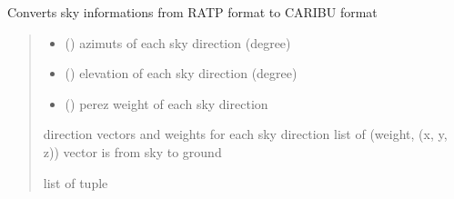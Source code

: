 \documentclass[letterpaper,10pt,english]{sphinxmanual}
\begin{document}
\begin{fulllineitems}
\label{\detokenize{reference:sky.ratpformat_to_caribuformat}}
\pysigstartsignatures
{}
\pysigstopsignatures
\sphinxAtStartPar
Converts sky informations from RATP format to CARIBU format
\begin{quote}\begin{description}
\begin{itemize}
\item {} 
\sphinxAtStartPar
{} () \textendash{} azimuts of each sky direction (degree)

\item {} 
\sphinxAtStartPar
{} () \textendash{} elevation of each sky direction (degree)

\item {} 
\sphinxAtStartPar
{} () \textendash{} perez weight of each sky direction

\end{itemize}

\sphinxAtStartPar
direction vectors and weights for each sky direction
list of (weight, (x, y, z))
vector is from sky to ground

\sphinxAtStartPar
list of tuple

\end{description}\end{quote}

\end{fulllineitems}

\end{document}
